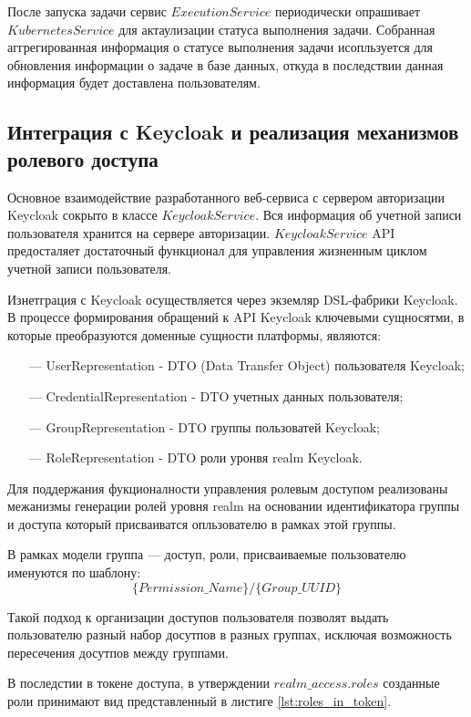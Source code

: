 После запуска задачи сервис $ExecutionService$ периодически опрашивает $KubernetesService$ для актаулизации статуса выполнения задачи.
Собранная аггрегированная информация о статусе выполнения задачи исопльзуется для обновления информации о задаче в базе данных, откуда в последствии данная информация будет доставлена пользователям.

\subsection{Интеграция с Keycloak и реализация механизмов ролевого доступа}

Основное взаимодействие разработанного веб-сервиса с сервером авторизации Keycloak сокрыто в классе $KeycloakService$.
Вся информация об учетной записи пользователя хранится на сервере авторизации.
$KeycloakService$ API предосталяет достаточный функционал для управления жизненным циклом учетной записи пользователя.

Изнетграция с Keycloak осуществляется через экземляр DSL-фабрики Keycloak.
В процессе формирования обращений к API Keycloak ключевыми сущносятми, в которые преобразуются доменные сущности платформы, являются:

\begin{itemize}
  \item[---]UserRepresentation - DTO (Data Transfer Object) пользователя Keycloak;
  \item[---]CredentialRepresentation - DTO учетных данных пользователя;
  \item[---]GroupRepresentation - DTO группы пользоватей Keycloak;
  \item[---]RoleRepresentation - DTO роли уронвя realm Keycloak.
\end{itemize}

Для поддержания фукционалности управления ролевым доступом реализованы межанизмы генерации ролей уровня realm на основании идентификатора группы и доступа который присваиватся опльзователю в рамках этой группы.

В рамках модели группа --- доступ, роли, присваиваемые пользователю именуются по шаблону:
$$
\{Permission\_Name\}/\{Group\_UUID\}
$$

Такой подход к организации доступов пользователя позволят выдать пользователю разный набор досутпов в разных группах, исключая возможность пересечения досутпов между группами.

В последстии в токене доступа, в утверждении $realm\_access.roles$ созданные роли принимают вид представленный в листиге \ref{lst:roles_in_token}.

